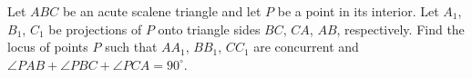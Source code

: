 Let $ABC$ be an acute scalene triangle and let $P$ be a point in its interior. Let $A_1$, $B_1$, $C_1$ be projections of $P$ onto triangle sides $BC$, $CA$, $AB$, respectively. Find the locus of points $P$ such that $AA_1$, $BB_1$, $CC_1$ are concurrent and $\angle PAB + \angle PBC + \angle PCA = 90^{\circ}$.